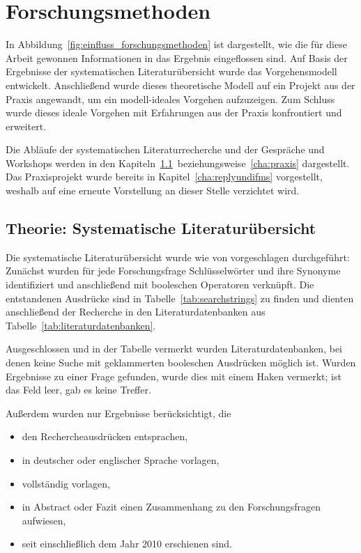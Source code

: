 \section{Forschungsmethoden}
\label{cha:method}
In Abbildung~\ref{fig:einfluss_forschungsmethoden} ist dargestellt, wie die für diese Arbeit gewonnen Informationen in das Ergebnis eingeflossen sind. Auf Basis der 
Ergebnisse der systematischen Literaturübersicht wurde das Vorgehensmodell 
entwickelt. Anschließend wurde dieses theoretische Modell auf ein Projekt aus 
der Praxis angewandt, um ein modell-ideales Vorgehen aufzuzeigen. Zum Schluss 
wurde dieses ideale Vorgehen mit Erfahrungen aus der Praxis konfrontiert und 
erweitert.

Die Abläufe der systematischen Literaturrecherche und der Gespräche und 
Workshops werden in den 
Kapiteln~\ref{cha:literaturuebersicht}~beziehungsweise~\ref{cha:praxis} 
dargestellt. Das Praxisprojekt wurde bereits in Kapitel~\ref{cha:replyundifms} 
vorgestellt, weshalb auf eine erneute Vorstellung an dieser Stelle verzichtet 
wird.
\subsection{Theorie: Systematische Literaturübersicht}
\label{cha:literaturuebersicht}
Die systematische Literaturübersicht wurde wie von  
vorgeschlagen durchgeführt: Zunächst wurden für jede Forschungsfrage 
Schlüsselwörter und ihre Synonyme identifiziert und anschließend mit booleschen 
Operatoren verknüpft. Die entstandenen Ausdrücke sind in 
Tabelle~\ref{tab:searchstrings} zu finden und dienten anschließend der 
Recherche in den Literaturdatenbanken aus Tabelle~\ref{tab:literaturdatenbanken}.


Ausgeschlossen und in der Tabelle vermerkt wurden Literaturdatenbanken, bei 
denen keine Suche mit geklammerten booleschen Ausdrücken möglich ist. Wurden 
Ergebnisse zu einer Frage gefunden, wurde dies mit einem Haken vermerkt; ist 
das Feld leer, gab es keine Treffer.



Außerdem wurden nur Ergebnisse berücksichtigt, die
\begin{itemize}
	\item den Rechercheausdrücken entsprachen,
	\item in deutscher oder englischer Sprache vorlagen,
	\item vollständig vorlagen,
	\item in Abstract oder Fazit einen Zusammenhang zu den Forschungsfragen
aufwiesen,
	\item seit einschließlich dem Jahr 2010 erschienen sind.
\end{itemize}
\begin{comment}
In diesem Kapitel erläutern Sie ihre Forschungsmethode unter Verwendung von
entsprechenden Quellen.
Begründen Sie auch, warum Sie sich für diese Forschungsmethode entschieden
haben
und warum sie geeignet ist, die vorliegende Forschungsfrage zu beantworten.
\end{comment}


